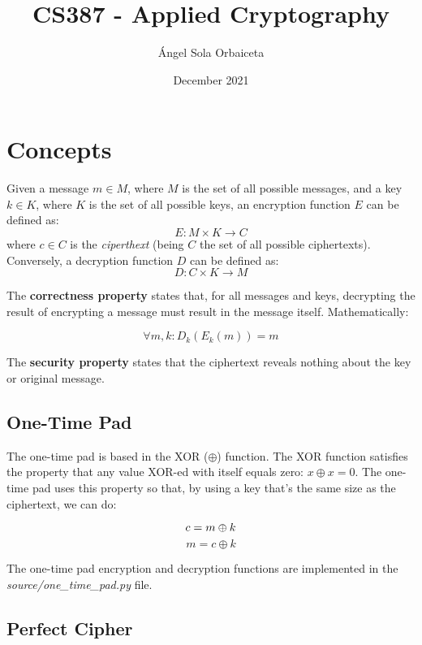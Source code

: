 \documentclass[12pt, letterpaper]{article}
\title{CS387 - Applied Cryptography}
\author{\'Angel Sola Orbaiceta}
\date{December 2021}
\begin{document}
\begin{titlepage}
  \maketitle
\end{titlepage}

\section{Concepts}

Given a message $m \in M$, where $M$ is the set of all possible messages, and a key $k \in K$, where $K$ is the set of all possible keys, an encryption function $E$ can be defined as:
\[
  E: M \times K \to C
\]
where $c \in C$ is the \emph{ciperthext} (being $C$ the set of all possible ciphertexts).
Conversely, a decryption function $D$ can be defined as:
\[
  D: C \times K \to M
\]

The \textbf{correctness property} states that, for all messages and keys, decrypting the result of encrypting a message must result in the message itself.
Mathematically:

\[
  \forall m,k: D_k (E_k(m)) = m
\]

The \textbf{security property} states that the ciphertext reveals nothing about the key or original message.

\subsection{One-Time Pad}

The one-time pad is based in the XOR ($\oplus$) function.
The XOR function satisfies the property that any value XOR-ed with itself equals zero: $x \oplus x = 0$.
The one-time pad uses this property so that, by using a key that's the same size as the ciphertext, we can do:

\[
  c = m \oplus k\\
\]
\[
  m = c \oplus k
\]

The one-time pad encryption and decryption functions are implemented in the \emph{source/one\_time\_pad.py} file.

\subsection{Perfect Cipher}
\end{document}
